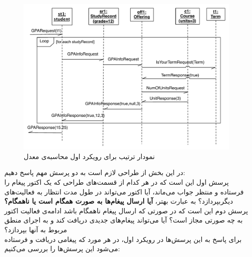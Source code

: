 \begin{figure}
    \begin{center}
	\includegraphics[width=16cm]{4-ProposedFramework/Figures/gpa_1_sequence.pdf}
    \end{center}
    \caption{\label{fig:gpa1_sequence} نمودار ترتیب برای رویکرد اول محاسبه‌ی معدل }
\end{figure}
\FloatBarrier
در این بخش از طراحی لازم است به دو پرسش مهم پاسخ دهیم:\\
پرسش اول این است که در هر کدام از قسمت‌های طراحی که یک اکتور پیغام را فرستاده و منتظر جواب می‌ماند، آیا اکتور می‌تواند در طول مدت انتظار به فعالیت‌های دیگربپردازد؟ به عبارت بهتر، \textbf{آیا ارسال پیغام‌ها به صورت همگام است یا ناهمگام؟}\\
پرسش دوم این است که در صورتی که ارسال پیغام ناهمگام باشد ادامه‌ی فعالیت اکتور به چه صورتی مجاز است؟ آیا می‌تواند پیغام‌های جدیدی دریافت کند و به اجرای منطق مربوط به آنها بپردازد؟\\
برای پاسخ به این پرسش‌ها در رویکرد اول، در هر مورد که پیغامی دریافت و فرستاده می‌شود این پرسش‌ها را بررسی می‌کنیم:
